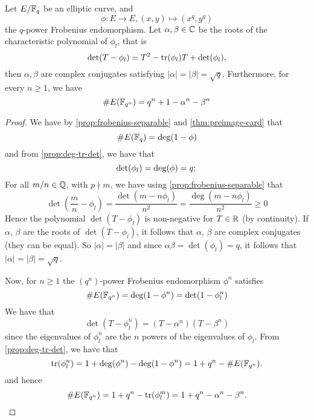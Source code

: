 \begin{proposition}
	\label{prop:frob-char-poly}
	Let $E/\mathbb{F}_q$ be an elliptic curve, and
	\begin{equation*}
		\phi: E \to E, (x, y) \mapsto (x^q, y^q)
	\end{equation*}
	the $q$-power Frobenius endomorphism.
	Let $\alpha, \beta \in \mathbb{C}$ be the roots of the characteristic polynomial
	of $\phi_l$, that is
	\begin{equation*}
		\det(T - \phi_l) = T^2 - \operatorname{tr}(\phi_l)T + \det(\phi_l),
	\end{equation*}
	then $\alpha, \beta$ are complex conjugates satisfying
	$|\alpha| = |\beta| = \sqrt{q}$. Furthermore, for every $n \geq 1$, we
	have
	\begin{equation*}
		\#E(\mathbb{F}_{q^n}) = q^n + 1 - \alpha^n - \beta^n
	\end{equation*}
\end{proposition}

\begin{proof}
	We have by \ref{prop:frobenius-separable}
	and \ref{thm:preimage-card}
	that
	\begin{equation*}
		\#E(\mathbb{F}_q) = \deg(1 - \phi)
	\end{equation*}
	and from \ref{prop:deg-tr-det}, we have that
	\begin{equation*}
		\det(\phi_l) = \deg(\phi) = q;\\
	\end{equation*}
	For all $m/n \in \mathbb{Q}$, with $p \nmid m$,
	we have using \ref{prop:frobenius-separable} that
	\begin{equation*}
		\det\left(\frac{m}{n} - \phi_l\right)
		= \frac{\det(m - n\phi_l)}{n^2}
		= \frac{\deg(m - n\phi_l)}{n^2} \geq 0
	\end{equation*}
	Hence the polynomial $\det(T - \phi_l)$ is non-negative for $T \in \mathbb{R}$
	(by continuity). If $\alpha$, $\beta$ are the roots of $\det(T - \phi_l)$,
	it follows that $\alpha$, $\beta$ are complex conjugates (they can be
	equal). So $|\alpha| = |\beta|$ and since $\alpha\beta = \det(\phi_l) = q$,
	it follows that $|\alpha| = |\beta| = \sqrt{q}$.

	Now, for $n \geq 1$ the $(q^n)$-power Frobenius endomorphism
	$\phi^n$ satisfies
	\begin{equation*}
		\#E(\mathbb{F}_{q^n}) = \deg(1 - \phi^n) = \det(1 - \phi_l^n)
	\end{equation*}
	We have that
	\begin{equation*}
		\det(T - \phi_l^n) = (T - \alpha^n)(T - \beta^n)
	\end{equation*}
	since the eigenvalues of $\phi_l^n$ are the $n$ powers
	of the eigenvalues of $\phi_l$. From 
	\ref{prop:deg-tr-det}, we have that
	\begin{equation*}
		\operatorname{tr}(\phi_l^n) = 1 + \deg(\phi^n) - \deg(1 - \phi^n)
		= 1 + q^n - \#E(\mathbb{F}_{q^n}).
	\end{equation*}
	and hence 
	\begin{equation*}
		\#E(\mathbb{F}_{q^n}) = 1 + q^n - \operatorname{tr}(\phi_l^m)
		= 1 + q^n - \alpha^n - \beta^n.
	\end{equation*}
\end{proof}

